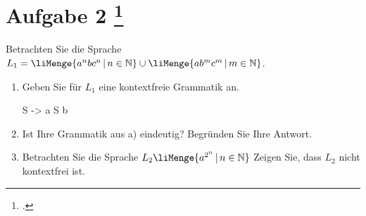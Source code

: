 \documentclass{lehramt-informatik-aufgabe}
\begin{document}
\let\m=\liMenge
{}
\section{Aufgabe 2
\footcite{66115:2017:09}}

Betrachten Sie die Sprache $L_1 = \m{a^n b c^n \, | \, n \in \mathbb{N}} \cup
\m{a b^m c^m \, | \, m \in \mathbb{N}}$.

\begin{enumerate}


\item Geben Sie für $L_1$ eine kontextfreie Grammatik an.
\begin{liAntwort}
\begin{liProduktionsRegeln}
S -> a S b
\end{liProduktionsRegeln}
\end{liAntwort}


\item Ist Ihre Grammatik aus a) eindeutig? Begründen Sie Ihre Antwort.


\item Betrachten Sie die Sprache $L_2 \m{a^ {2^n} \, | \, n \in
\mathbb{N}}$ Zeigen Sie, dass $L_2$ nicht kontextfrei ist.
\end{enumerate}
\end{document}
